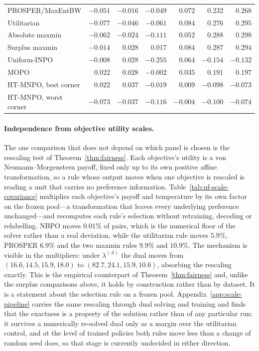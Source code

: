 \documentclass{article}
\theoremstyle{remark}
\theoremstyle{plain}
\newcommand{\NBPO}{\textsc{NBPO}}
\begin{document}
\begin{table}[t]
\begin{tabular}{lrrrrrr}
PROSPER/MaxEntBW & $-0.051$ & $-0.016$ & $-0.049$ & $0.072$ & $0.232$ & $0.268$\\
Utilitarian & $-0.077$ & $-0.046$ & $-0.061$ & $0.084$ & $0.276$ & $0.295$\\
Absolute maxmin & $-0.062$ & $-0.024$ & $-0.111$ & $0.052$ & $\mathbf{0.288}$ & $\mathbf{0.298}$\\
Surplus maxmin & $-0.014$ & $0.028$ & $\mathbf{0.017}$ & $0.084$ & $0.287$ & $0.294$\\
Uniform-INPO & $-0.008$ & $0.028$ & $-0.255$ & $0.064$ & $-0.154$ & $-0.132$\\
MOPO & $0.022$ & $0.028$ & $-0.002$ & $0.035$ & $0.191$ & $0.197$\\
HT-MNPO, best corner & $0.022$ & $0.037$ & $-0.019$ & $0.009$ & $-0.098$ & $-0.073$\\
HT-MNPO, worst corner & $-0.073$ & $-0.037$ & $-0.116$ & $-0.004$ & $-0.100$ & $-0.074$\\
\bottomrule
\end{tabular}
\end{table}

\paragraph{Independence from objective utility scales.}
The one comparison that does not depend on which panel is chosen is the rescaling test of
Theorem~\ref{thm:fairness}. Each objective's utility is a von Neumann--Morgenstern payoff, fixed only up to
its own positive affine transformation, so a rule whose output moves when one objective is rescaled is
reading a unit that carries no preference information. Table~\ref{tab:uf-scale-covariance} multiplies each
objective's payoff and temperature by its own factor on the frozen pool---a transformation that leaves every
underlying preference unchanged---and recomputes each rule's selection without retraining, decoding or
relabelling. \NBPO{} moves $0.01\%$ of pairs, which is the numerical floor of the solver rather than a real
deviation, while the utilitarian rule moves $5.9\%$, PROSPER $6.9\%$ and the two maxmin rules $9.9\%$ and
$10.9\%$. The mechanism is visible in the multipliers: under $\lambda^{(A)}$ the dual moves from
$(16.6,14.5,15.9,18.0)$ to $(82.7,24.1,15.9,10.6)$, absorbing the rescaling exactly. This is the empirical
counterpart of Theorem~\ref{thm:fairness} and, unlike the surplus comparisons above, it holds by
construction rather than by dataset. It is a statement about the selection rule on a frozen pool.
Appendix~\ref{app:scale-pipeline} carries the same rescaling through dual solving and training and
finds that the exactness is a property of the solution rather than of any particular run: it survives
a numerically re-solved dual only as a margin over the utilitarian control, and at the level of trained
policies both rules move less than a change of random seed does, so that stage is currently
undecided in either direction.
\end{document}
